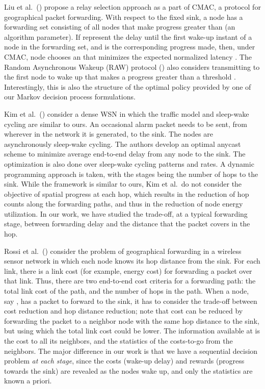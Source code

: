 \documentclass[onecolumn]{IEEEtran}
\begin{document}
Liu et al.\ (\cite{liu-etal07CMAC}) propose a relay selection approach
as a part of CMAC, a protocol for geographical packet forwarding. With
respect to the fixed sink, a node  has a forwarding set consisting
of all nodes that make progress greater than  (an algorithm
parameter). If  represent the delay until the first wake-up instant
of a node in the forwarding set, and  is the corresponding progress
made, then, under CMAC, node  chooses an  that minimizes the
expected normalized latency . The Random
Asynchronous Wakeup (RAW) protocol (\cite{paruchuri-etal04RAW}) also
considers transmitting to the first node to wake up that makes a
progress greater than a threshold .  Interestingly, this is also the structure
of the optimal policy provided by one of our Markov decision process
formulations.

Kim et al.\ (\cite{kim-etal09optimal-anycast}) consider a dense WSN in
which the traffic model and sleep-wake cycling are similar to ours. An
occasional alarm packet needs to be sent, from wherever in the network
it is generated, to the sink. The nodes are asynchronously sleep-wake
cycling. The authors develop an optimal anycast scheme to minimize
average end-to-end delay from any node  to the sink. The
optimization is also done over sleep-wake cycling patterns and rates.
A dynamic programming approach is taken, with the stages being the
number of hops to the sink. While the framework is similar to ours,
Kim et al.\ do not consider the objective of spatial progress at each
hop, which results in the reduction of hop counts along the forwarding
paths, and thus in the reduction of node energy utilization. In our
work, we have studied the trade-off, at a typical forwarding stage,
between forwarding delay and the distance that the packet covers in
the hop.

Rossi et al.\ (\cite{rossi-etal08SARA}) consider the problem of
geographical forwarding in a wireless sensor network in which each node
knows its hop distance from the sink. For each link, there is a link
cost (for example, energy cost) for forwarding a packet over that
link. Thus, there are two end-to-end cost criteria for a forwarding
path: the total link cost of the path, and the number of hops in the
path. When a node, say , has a packet to forward to the sink, it
has to consider the trade-off between cost reduction and hop distance
reduction; note that cost can be reduced by forwarding the packet to a
neighbor node with the same hop distance to the sink, but using which
the total link cost could be lower.  The information available at 
is the cost to all its neighbors, and the statistics of the
costs-to-go from the neighbors. The major difference in our work is
that we have a sequential decision problem \emph{at each stage}, since
the costs (wake-up delay) and rewards (progress towards the sink) are
revealed as the nodes wake up, and only the statistics are known a
priori.
\end{document}
